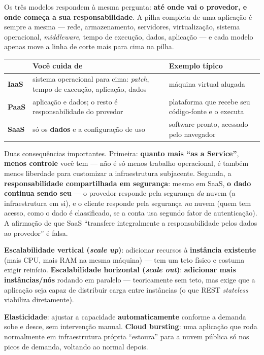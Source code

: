 \begin{conceito}
Os três modelos respondem à mesma pergunta: \textbf{até onde vai o
provedor, e onde começa a sua responsabilidade}. A pilha completa de uma
aplicação é sempre a mesma --- rede, armazenamento, servidores,
virtualização, sistema operacional, \textit{middleware}, tempo de
execução, dados, aplicação --- e cada modelo apenas move a linha de corte
mais para cima na pilha.

\begin{center}
\begin{tabular}{@{}p{2cm}p{4.6cm}p{5.4cm}@{}}
\toprule
& \textbf{Você cuida de} & \textbf{Exemplo típico} \\
\midrule
\textbf{IaaS} & sistema operacional para cima: \textit{patch}, tempo de
execução, aplicação, dados & máquina virtual alugada \\
\textbf{PaaS} & aplicação e dados; o resto é responsabilidade do provedor
& plataforma que recebe seu código-fonte e o executa \\
\textbf{SaaS} & só os \textbf{dados} e a configuração de uso & software
pronto, acessado pelo navegador \\
\bottomrule
\end{tabular}
\end{center}

Duas consequências importantes. Primeira: \textbf{quanto mais “as a
Service”}, \textbf{menos controle} você tem --- não é só menos trabalho
operacional, é também menos liberdade para customizar a infraestrutura
subjacente. Segunda, a \textbf{responsabilidade compartilhada em
segurança}: mesmo em SaaS, \textbf{o dado continua sendo seu} --- o
provedor responde pela segurança \textit{da} nuvem (a infraestrutura em
si), e o cliente responde pela segurança \textit{na} nuvem (quem tem
acesso, como o dado é classificado, se a conta usa segundo fator de
autenticação). A afirmação de que SaaS “transfere integralmente a
responsabilidade pelos dados ao provedor” é falsa.
\end{conceito}

\begin{conceito}
\textbf{Escalabilidade vertical (\textit{scale up})}: adicionar recursos à
\textbf{instância existente} (mais CPU, mais RAM na mesma máquina) ---
tem um teto físico e costuma exigir reinício.
\textbf{Escalabilidade horizontal (\textit{scale out})}: \textbf{adicionar
mais instâncias/nós} rodando em paralelo --- teoricamente sem teto, mas
exige que a aplicação seja capaz de distribuir carga entre instâncias (o
que REST \textit{stateless} viabiliza diretamente).

\textbf{Elasticidade}: ajustar a capacidade \textbf{automaticamente}
conforme a demanda sobe e desce, sem intervenção manual. \textbf{Cloud
bursting}: uma aplicação que roda normalmente em infraestrutura própria
“estoura” para a nuvem pública só nos picos de demanda, voltando ao normal
depois.
\end{conceito}

